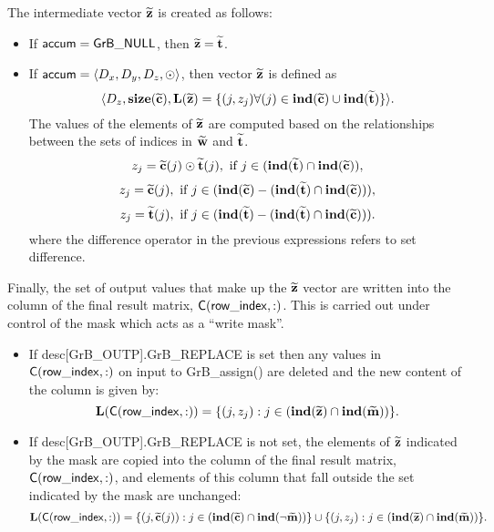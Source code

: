 The intermediate vector ${\bf \widetilde{z}}$ is created as follows:
\begin{itemize}
    \item If ${\sf accum} = {\sf GrB\_NULL}$, then 
    ${\bf \widetilde{z}} = {\bf \widetilde{t}}$.

    \item If ${\sf accum} = \langle D_x, D_y, D_z, \odot \rangle$, then vector 
    ${\bf \widetilde{z}}$ is defined as 
        \[ \langle D_z, \bold{size}({\bf \widetilde{c}}), 
        \bold{L}({\bf \widetilde{z}}) = \{(j,z_{j})  
        \forall (j) \in \bold{ind}({\bf \widetilde{c}}) \cup 
        \bold{ind}({\bf \widetilde{t}}) \} \rangle.\]
    The values of the elements of ${\bf \widetilde{z}}$ are computed based on the relationships between the sets of indices in ${\bf \widetilde{w}}$ and ${\bf \widetilde{t}}$.
\[
z_{j} = {\bf \widetilde{c}}(j) \odot {\bf \widetilde{t}}(j), \ \mbox{if}\  
j \in  (\bold{ind}({\bf \widetilde{t}}) \cap \bold{ind}({\bf \widetilde{c}})),
\]
\[
z_{j} = \vector{\widetilde{c}}(j), \ \mbox{if}\  j \in  (\bold{ind}(
\vector{\widetilde{c}}) - (\bold{ind}(\vector{\widetilde{t}}) \cap 
\bold{ind}(\vector{\widetilde{c}}))),
\]
\[
z_{j} = \vector{\widetilde{t}}(j), \ \mbox{if}\  j \in  (\bold{ind}(
\vector{\widetilde{t}}) - (\bold{ind}(\vector{\widetilde{t}}) \cap 
\bold{ind}(\vector{\widetilde{c}}))).
\]
where the difference operator in the previous expressions refers to set difference.
\end{itemize}

Finally, the set of output values that make up the ${\bf \widetilde{z}}$ 
vector are written into the column of the final result matrix, 
${\sf C}({\sf row\_index},:)$.  This is carried out under control of the mask 
which acts as a ``write mask''.
\begin{itemize}
    \item If {\sf desc[GrB\_OUTP].GrB\_REPLACE} is set then any values in 
    ${\sf C}({\sf row\_index},:)$ on input to {\sf GrB\_assign()} are deleted 
    and the new content of the column is given by:
    \[ 
    \bold{L}({\sf C}({\sf row\_index},:)) = \{(j,z_{j}) : j \in 
    (\bold{ind}({\bf \widetilde{z}}) \cap \bold{ind}({\bf \widetilde{m}})) \}. 
    \]

    \item If {\sf desc[GrB\_OUTP].GrB\_REPLACE} is not set, the elements of 
    ${\bf \widetilde{z}}$ indicated by the mask are copied into the column 
    of the final result matrix, ${\sf C}({\sf row\_index},:)$, and elements of 
    this column that fall outside the set indicated by the mask are unchanged:
    \[ 
    \bold{L}({\sf C}({\sf row\_index},:)) = 
    \{(j,{\bf \widetilde{c}}(j)) : j \in (\bold{ind}({\bf \widetilde{c}}) 
    \cap \bold{ind}(\neg {\bf \widetilde{m}})) \} \cup \{(j,z_{j}) : j \in 
    (\bold{ind}({\bf \widetilde{z}}) \cap \bold{ind}({\bf \widetilde{m}})) \}. 
    \]
\end{itemize}

